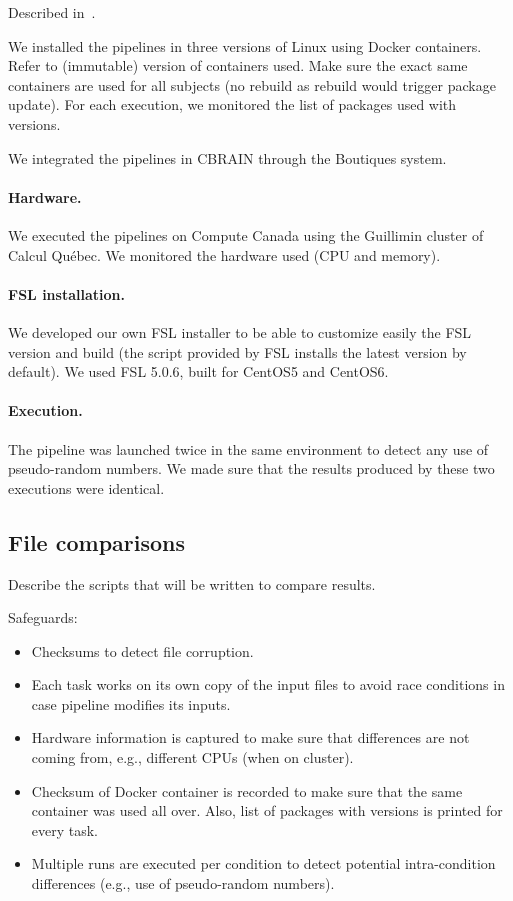 \documentclass{article}
\begin{document}
Described in~\cite{glasser2013minimal}.

We installed the pipelines in three versions of Linux using Docker
containers. Refer to (immutable) version of containers used. Make sure
the exact same containers are used for all subjects (no rebuild as
rebuild would trigger package update). For each execution, we
monitored the list of packages used with versions.

We integrated the pipelines in CBRAIN through the Boutiques system.

\paragraph{Hardware.} We executed the pipelines on Compute Canada
using the Guillimin cluster of Calcul Qu\'ebec. We monitored the
hardware used (CPU and memory). 

\paragraph{FSL installation.} We developed our own FSL installer to be
able to customize easily the FSL version and build (the script
provided by FSL installs the latest version by default). We used FSL
5.0.6, built for CentOS5 and CentOS6.

\paragraph{Execution.} The pipeline was launched twice in the same
environment to detect any use of pseudo-random numbers. We
made sure that the results produced by these two executions were
identical.

\subsection{File comparisons}

Describe the scripts that will be written to compare results.

Safeguards:
\begin{itemize}
\item Checksums to detect file corruption.
\item Each task works on its own copy of the input files to avoid race conditions in case pipeline modifies its inputs.
\item Hardware information is captured to make sure that differences are not coming from, e.g., different CPUs (when on cluster).
\item Checksum of Docker container is recorded to make sure that the same container was used all over. Also, list of packages with versions is printed for every task. 
\item Multiple runs are executed per condition to detect potential intra-condition differences (e.g., use of pseudo-random numbers).
\end{itemize}
\end{document}
